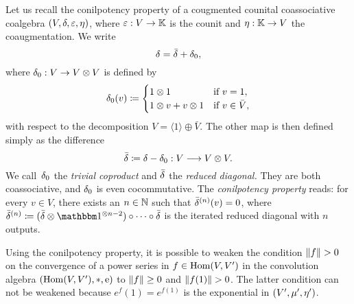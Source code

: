 \documentclass[\MainFolder/Text.tex]{subfiles}
\begin{document}
Let us recall the conilpotency property of a cougmented counital coassociative coalgebra $(V,\delta,\varepsilon,\eta)$, where $\varepsilon: V \rightarrow \mathbb{K}$ is the counit and $\eta: \mathbb{K}\rightarrow V$ the coaugmentation. We write
$$ \delta =\bar{\delta}+ \delta_0, $$
where $\delta_0: V \rightarrow V\otimes V$ is defined by
\begin{equation}\label{Eq:CoProdOne}
\delta_0(v) \coloneqq \begin{cases} 1 \otimes 1 & \text{if }v=1, \\
1\otimes v + v\otimes 1 & \text{if }v\in \bar{V},\end{cases}
\end{equation}
with respect to the decomposition $V = \langle 1 \rangle \oplus \bar{V}$. The other map is then defined simply as the difference 
$$ \bar{\delta} \coloneqq \delta - \delta_0: V \longrightarrow V\otimes V. $$
We call~$\delta_0$ the \emph{trivial coproduct} and $\bar{\delta}$ the \emph{reduced diagonal.} They are both coassociative, and $\delta_0$ is even cocommutative. The \emph{conilpotency property} reads: for every $v\in V$, there exists an $n\in \mathbb{N}$ such that $\bar{\delta}^{(n)}(v) = 0$, where $\bar{\MVCoProd}^{(n)}\coloneqq(\bar{\MVCoProd}\otimes\Id^{\otimes n-2})\circ \dotsb\circ\bar{\MVCoProd}$ is the iterated reduced diagonal with $n$ outputs.

Using the conilpotency property, it is possible to weaken the condition $\Norm{f}>0$ on the convergence of a power series in $f\in\mathrm{Hom}(V,V')$ in the convolution algebra $(\mathrm{Hom}(V,V'),*,\mathrm{e})$ to $\| f \|\ge 0$ and $\Norm{f(1)}>0$. The latter condition can not be weakened because $e^f(1) = e^{f(1)}$ is the exponential in $(V',\mu',\eta')$.
\end{document}
